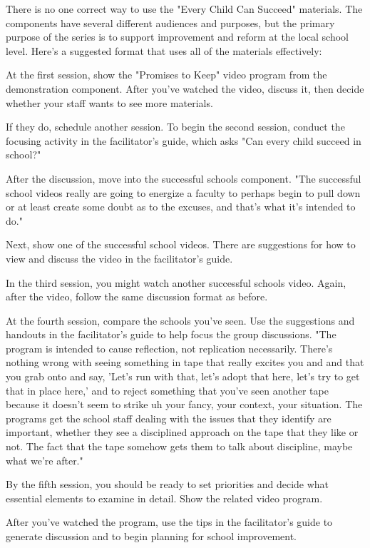 There is no one correct way to use the "Every Child Can Succeed" materials.
The components have several different audiences and purposes, but the primary purpose of the series is to support improvement and reform at the local school level.
Here's a suggested format that uses all of the materials effectively:

At the first session, show the "Promises to Keep" video program from the demonstration component.
After you've watched the video, discuss it, then decide whether your staff wants to see more materials.

If they do, schedule another session.
To begin the second session, conduct the focusing activity in the facilitator's guide, which asks "Can every child succeed in school?"

After the discussion, move into the successful schools component.
"The successful school videos really are going to energize a faculty to perhaps begin to pull down or at least create some doubt as to the excuses, and that's what it's intended to do."

Next, show one of the successful school videos.
There are suggestions for how to view and discuss the video in the facilitator's guide.

In the third session, you might watch another successful schools video.
Again, after the video, follow the same discussion format as before.

At the fourth session, compare the schools you've seen.
Use the suggestions and handouts in the facilitator's guide to help focus the group discussions.
"The program is intended to cause reflection, not replication necessarily.
There's nothing wrong with seeing something in tape that really excites you and and that you grab onto and say, 'Let's run with that, let's adopt that here, let's try to get that in place here,' and to reject something that you've seen another tape because it doesn't seem to strike uh your fancy, your context, your situation.
The programs get the school staff dealing with the issues that they identify are important, whether they see a disciplined approach on the tape that they like or not.
The fact that the tape somehow gets them to talk about discipline, maybe what we're after."

By the fifth session, you should be ready to set priorities and decide what essential elements to examine in detail.
Show the related video program.

After you've watched the program, use the tips in the facilitator's guide to generate discussion and to begin planning for school improvement.

